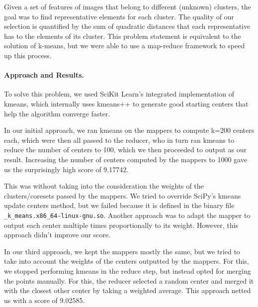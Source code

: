 \documentclass[a4paper, 11pt]{article}
\begin{document}
Given a set of features of images that belong to different (unknown) clusters, the goal was to find representative elements for each cluster. The quality of our selection is quantified by the sum of quadratic distances that each representative has to the elements of its cluster.
This problem statement is equivalent to the solution of k-means, but we were able to use a map-reduce framework to speed up this process.


\paragraph{Approach and Results.\!\!\!}

To solve this problem, we used SciKit Learn's integrated implementation of kmeans, which internally uses kmeans++ to generate good starting centers that help the algorithm converge faster.

In our initial approach, we ran kmeans on the mappers to compute k=200 centers each, which were then all passed to the reducer, who in turn ran kmeans to reduce the number of centers to 100, which we then proceeded to output as our result. Increasing the number of centers computed by the mappers to 1000 gave us the surprisingly high score of 9.17742.

This was without taking into the consideration the weights of the clusters/coresets passed by the mappers. We tried to override SciPy's kmeans update centers method, but we failed because it is defined in the binary file \verb|_k_means.x86_64-linux-gnu.so|. Another approach was to adapt the mapper to output each center multiple times proportionally to its weight. However, this approach didn't improve our score.

In our third approach, we kept the mappers mostly the same, but we tried to take into account the weights of the centers outputted by the mappers. For this, we stopped performing kmeans in the reduce step, but instead opted for merging the points manually. For this, the reducer selected a random center and merged it with the closest other center by taking a weighted average.
This approach netted us with a score of 9.02585.
\end{document}
